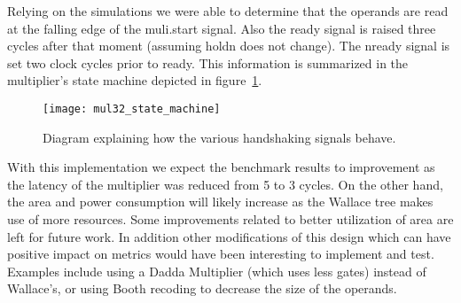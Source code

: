 Relying on the simulations we were able to determine that the operands are read at the falling edge of the muli.start signal. Also the ready signal is raised three cycles after that moment (assuming holdn does not change). The nready signal is set two clock cycles prior to ready.
This information is summarized in the multiplier's state machine depicted in figure~\ref{fig:mul32_state_machine}.

\begin{figure}[H]
\centering
\texttt{[image: mul32\_state\_machine]}
\caption{Diagram explaining how the various handshaking signals behave.}
\label{fig:mul32_state_machine}
\end{figure}



With this implementation we expect the benchmark results to improvement as the latency of the multiplier was reduced from 5 to 3 cycles. On the other hand, the area and power consumption will likely increase as the Wallace tree makes use of more resources. Some improvements related to better utilization of area are left for future work. In addition other modifications of this design which can have positive impact on metrics would have been interesting to implement and test. Examples include using a Dadda Multiplier (which uses less gates) instead of Wallace's, or using Booth recoding to decrease the size of the operands.


